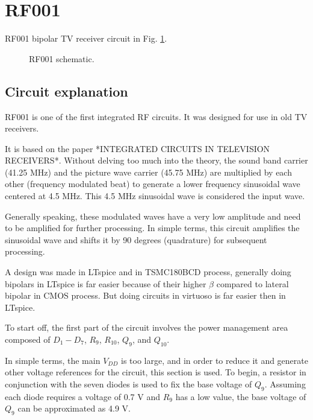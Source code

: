 \documentclass[12pt]{article}
\begin{document}
\newpage

\section{RF001}



RF001 bipolar TV receiver circuit in Fig. \ref{RF001 }. 

\begin{figure}[H]
        \centering
        
        \caption{RF001   schematic.}
        \label{RF001 }
\end{figure}

\subsection{Circuit explanation}

RF001 is one of the first integrated RF circuits. It was designed for use in old TV receivers.  

It is based on the paper *INTEGRATED CIRCUITS IN TELEVISION RECEIVERS*. Without delving too much into the theory, the sound band carrier (41.25 MHz) and the picture wave carrier (45.75 MHz) are multiplied by each other (frequency modulated beat) to generate a lower frequency sinusoidal wave centered at 4.5 MHz. This 4.5 MHz sinusoidal wave is considered the input wave.  

Generally speaking, these modulated waves have a very low amplitude and need to be amplified for further processing. In simple terms, this circuit amplifies the sinusoidal wave and shifts it by 90 degrees (quadrature) for subsequent processing.

A design was made in LTspice and in TSMC180BCD process, generally doing bipolars in LTspice is far easier because of their higher $\beta$ compared to lateral bipolar in CMOS process. But doing circuits in virtuoso is far easier then in LTspice.

To start off, the first part of the circuit involves the power management area composed of $D_1 - D_7$, $R_9$, $R_{10}$, $Q_9$, and $Q_{10}$.  

In simple terms, the main $V_{DD}$ is too large, and in order to reduce it and generate other voltage references for the circuit, this section is used. To begin, a resistor in conjunction with the seven diodes is used to fix the base voltage of $Q_9$. Assuming each diode requires a voltage of 0.7 V and $R_9$ has a low value, the base voltage of $Q_9$ can be approximated as 4.9 V.  
\end{document}
